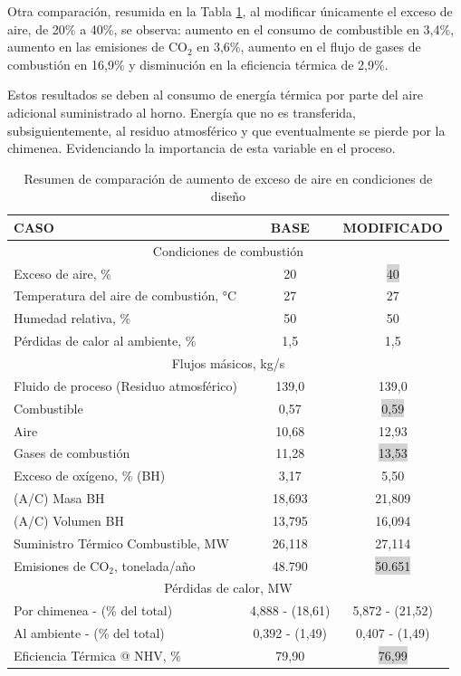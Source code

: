\par Otra comparación, resumida en la Tabla \ref{tbl:comparison-air}, al modificar únicamente el exceso de aire, de 20\% a 40\%, se observa: aumento en el consumo de combustible en 3,4\%, aumento en las emisiones de CO$_2$ en 3,6\%, aumento en el flujo de gases de combustión en 16,9\% y disminución en la eficiencia térmica de 2,9\%. 
\par Estos resultados se deben al consumo de energía térmica por parte del aire adicional suministrado al horno. Energía que no es transferida, subsiguientemente, al residuo atmosférico y que eventualmente se pierde por la chimenea. Evidenciando la importancia de esta variable en el proceso.
\begin{table}[H]
\caption{Resumen de comparación de aumento de exceso de aire en condiciones de diseño}
\label{tbl:comparison-air} \centering \begin{tabular}{l|c|c}
\quad\quad\quad CASO & BASE & MODIFICADO \\
\hline
\multicolumn{3}{c}{Condiciones de combustión} \\
Exceso de aire, \%      &20  &\colorbox{lightgray}{40}\\
Temperatura del aire de combustión, °C  &27     &27   \\
Humedad relativa, \%                    &50     &50   \\
Pérdidas de calor al ambiente, \%       &1,5    &1,5  \\
\multicolumn{3}{c}{Flujos másicos,  kg/s} \\
Fluido de proceso (Residuo atmosférico)   &139,0         &139,0  \\
Combustible           &0,57  &\colorbox{lightgray}{0,59} \\
Aire                  &10,68 & 12,93  \\
Gases de combustión   &11,28 &\colorbox{lightgray}{13,53}  \\
\hline
Exceso de oxígeno, \% (BH) &3,17   &5,50   \\
(A/C) Masa BH              &18,693 &21,809 \\
(A/C) Volumen BH           &13,795 &16,094  \\
\hline
Suministro Térmico Combustible,  MW  &26,118 &27,114 \\
\hline
Emisiones de CO$_2$, tonelada/año &48.790  &\colorbox{lightgray}{50.651} \\
\hline
\multicolumn{3}{c}{Pérdidas de calor,  MW}\\
Por chimenea - (\% del total)&4,888 - (18,61) &5,872 - (21,52) \\
Al ambiente - (\% del total) &0,392 - (1,49)  &0,407 - (1,49) \\
\hline
Eficiencia Térmica @ NHV, \%  &79,90 &\colorbox{lightgray}{76,99} \\
\end{tabular} \end{table}